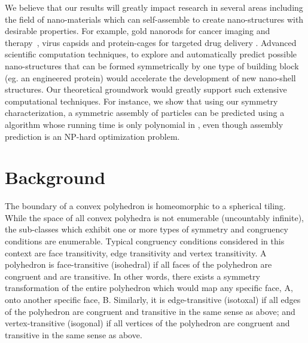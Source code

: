\documentclass[11pt]{article}
\newcommand{\1}{\mathds{1}}
\begin{document}
We believe that our results will greatly impact research in several areas including the field of nano-materials which can self-assemble to create nano-structures with desirable properties. For example, gold nanorods for cancer imaging and therapy~\cite{Chen_2005,XiaGold2014}, virus capsids and protein-cages for targeted drug delivery \cite{Shi_2010,Smith_2013,Steinmetz_2009,Shang_2012}. Advanced scientific computation techniques, to explore and automatically predict possible nano-structures that can be formed symmetrically by one type of building block (eg. an engineered protein) would accelerate the development of new nano-shell structures. Our theoretical groundwork would greatly support such extensive computational techniques. For instance, we show that using our symmetry characterization, a symmetric assembly of  particles can be predicted using a algorithm whose running time is only polynomial in , even though assembly prediction is an NP-hard optimization problem. 

\section{Background}

The boundary of a convex polyhedron is homeomorphic to a spherical tiling. While the space of all convex polyhedra is not enumerable (uncountably infinite), the sub-classes which exhibit one or more types of symmetry and congruency conditions are enumerable. Typical congruency conditions considered in this context are face transitivity, edge transitivity and vertex transitivity. A polyhedron is face-transitive (isohedral) if all faces of the polyhedron are congruent and are transitive. In other words, there exists a symmetry transformation of the entire polyhedron which would map any specific face, A, onto another specific face, B. Similarly, it is edge-transitive (isotoxal) if all edges of the polyhedron are congruent and transitive in the same sense as above; and vertex-transitive (isogonal) if all vertices of the polyhedron are congruent and transitive in the same sense as above.  
\end{document}
